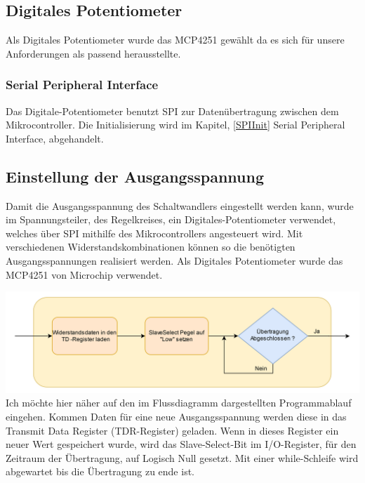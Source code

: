 \documentclass[paper=a4, 12pt]{scrreprt}
\begin{document}
			\subsection{Digitales Potentiometer}\hfill \break
			Als Digitales Potentiometer wurde das MCP4251 gewählt da es sich für unsere Anforderungen als passend herausstellte.
				\subsubsection{Serial Peripheral Interface}\hfill \break
			Das Digitale-Potentiometer benutzt SPI zur Datenübertragung zwischen dem Mikrocontroller. Die Initialisierung wird im Kapitel, \ref{SPIInit} Serial Peripheral Interface, abgehandelt.
			\subsection{Einstellung der Ausgangsspannung}\hfill \break
			Damit die Ausgangsspannung des Schaltwandlers eingestellt werden kann, wurde im Spannungsteiler, des Regelkreises, ein Digitales-Potentiometer verwendet, welches über SPI mithilfe des Mikrocontrollers angesteuert wird. Mit verschiedenen Widerstandskombinationen können so die benötigten Ausgangsspannungen realisiert werden.
			Als Digitales Potentiometer wurde das MCP4251 von Microchip verwendet.\hfill \break
			\begin{adjustbox}{center,caption={SPI Übertragung Ablauf},label={fig:SPIUebertragung},nofloat=figure,vspace=\bigskipamount}	
			\includegraphics[width=\textwidth]{img/SPIUebertragung.png}
			\end{adjustbox} \hfill \break
			Ich möchte hier näher auf den im Flussdiagramm dargestellten Programmablauf eingehen.\hfill \break
			Kommen Daten für eine neue Ausgangsspannung werden diese in das Transmit Data  Register (TDR-Register) geladen. Wenn in dieses Register ein neuer Wert gespeichert wurde, wird das Slave-Select-Bit im I/O-Register, für den Zeitraum der Übertragung, auf Logisch Null gesetzt. Mit einer while-Schleife wird abgewartet bis die Übertragung zu ende ist.
			
\end{document}
